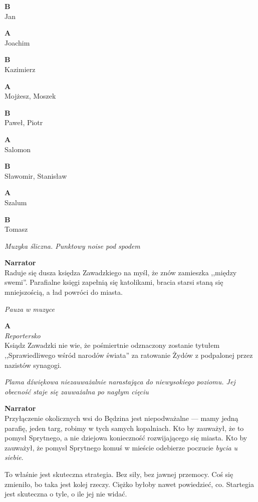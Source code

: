 \documentclass[11pt,a4paper,oneside]{article}
\begin{document}
\textbf{B}\\
Jan

\textbf{A}\\
Joachim

\textbf{B}\\
Kazimierz

\textbf{A}\\
Mojżesz,  Moszek

\textbf{B}\\
Paweł, Piotr

\textbf{A}\\
Salomon

\textbf{B}\\
Sławomir,  Stanisław

\textbf{A}\\
Szalum

\textbf{B}\\
Tomasz

{\color{light-gray} \emph{Muzyka śliczna. Punktowy noise pod spodem}}

\textbf{Narrator}\\
Raduje się dusza księdza Zawadzkiego na myśl, że znów zamieszka
,,między swemi''. Parafialne księgi zapełnią się katolikami, 
bracia starsi staną się mniejszością, a ład powróci do miasta.

{\color{light-gray} \emph{Pauza w muzyce}}

\textbf{A}\\
{\color{light-gray} \emph{Reportersko}}\\
Ksiądz Zawadzki nie wie, że pośmiertnie odznaczony zostanie tytułem
,,Sprawiedliwego wśród narodów świata'' za ratowanie Żydów
z podpalonej przez nazistów synagogi.

{\color{light-gray} \emph{Plama dźwiękowa niezauważalnie narastająca
do niewysokiego poziomu. Jej obecność staje się zauważalna po nagłym
cięciu}}

\textbf{Narrator}\\
Przyłączenie okolicznych wsi do Będzina jest niepodważalne --- mamy
jedną parafię, jeden targ, robimy w  tych samych kopalniach. Kto by
zauważył, że to pomysł Sprytnego, a nie dziejowa konieczność
rozwijającego się miasta.  Kto by zauważył, że pomysł Sprytnego komuś
w mieście odebierze poczucie \emph{bycia u siebie}.  

To właśnie jest skuteczna strategia. Bez siły, bez jawnej przemocy.
Coś się zmieniło, bo taka jest kolej rzeczy.  Ciężko byłoby nawet
powiedzieć, co. Startegia jest skuteczna o tyle, o ile jej nie widać. 
\end{document}
